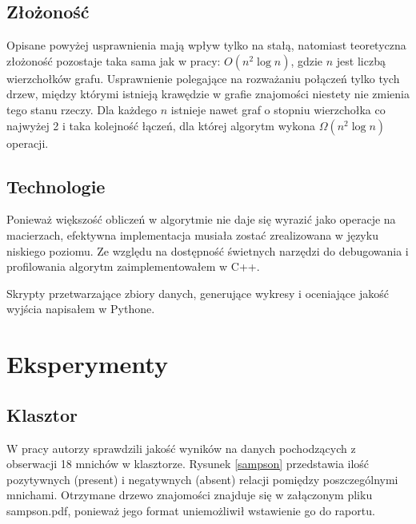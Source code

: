 \documentclass{article}
\begin{document}
\subsection{Złożoność}
Opisane powyżej usprawnienia mają wpływ tylko na stałą, natomiast teoretyczna
złożoność pozostaje taka sama jak w pracy: $O(n^2\log n)$, gdzie $n$ jest
liczbą wierzchołków grafu. Usprawnienie polegające na rozważaniu połączeń tylko
tych drzew, między którymi istnieją krawędzie w grafie znajomości niestety nie
zmienia tego stanu rzeczy. Dla każdego $n$ istnieje nawet graf o stopniu
wierzchołka co najwyżej 2 i taka kolejność łączeń, dla której algorytm wykona
$\Omega(n^2\log n)$ operacji.

\subsection{Technologie}
Ponieważ większość obliczeń w algorytmie nie daje się wyrazić jako operacje na 
macierzach, efektywna implementacja musiała zostać zrealizowana w języku 
niskiego poziomu. Ze względu na dostępność świetnych narzędzi do debugowania i
profilowania algorytm zaimplementowałem w C++. 

Skrypty przetwarzające zbiory danych, generujące wykresy i oceniające jakość 
wyjścia napisałem w Pythone.


\section{Eksperymenty}
\subsection{Klasztor}
W pracy \cite{BHCD} autorzy sprawdzili jakość wyników na danych pochodzących 
z obserwacji 18 mnichów w klasztorze. Rysunek \ref{sampson} przedstawia ilość
pozytywnych (present) i negatywnych (absent) relacji pomiędzy poszczególnymi 
mnichami. Otrzymane drzewo znajomości znajduje się w załączonym pliku sampson.pdf,
ponieważ jego format uniemożliwił wstawienie go do raportu.
\end{document}
